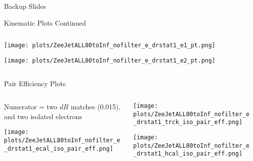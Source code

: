 \documentclass{beamer}
\begin{document}

\begin{frame}{}
  \huge{ Backup Slides }
\end{frame}


\begin{frame}{Kinematic Plots Continued}
  \begin{columns}

    \begin{column}{0.6\textwidth}
      \texttt{[image: plots/ZeeJetALL80toInf\_nofilter\_e\_drstat1\_e1\_pt.png]}

      \texttt{[image: plots/ZeeJetALL80toInf\_nofilter\_e\_drstat1\_e2\_pt.png]}
    \end{column}
  \end{columns}
\end{frame}


\begin{frame}{Pair Efficiency Plots}
  \begin{columns}

    \begin{column}{0.5\textwidth}
      Numerator = two $dR$ matches (0.015), and two isolated electrons \\ \bigskip

      \texttt{[image: plots/ZeeJetALL80toInf\_nofilter\_e\_drstat1\_ecal\_iso\_pair\_eff.png]}
    \end{column}

    \begin{column}{0.5\textwidth}
      \texttt{[image: plots/ZeeJetALL80toInf\_nofilter\_e\_drstat1\_trck\_iso\_pair\_eff.png]}

      \texttt{[image: plots/ZeeJetALL80toInf\_nofilter\_e\_drstat1\_hcal\_iso\_pair\_eff.png]}
    \end{column}

  \end{columns}
\end{frame}
\end{document}
